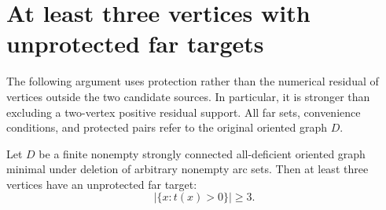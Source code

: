 \section{At least three vertices with unprotected far targets}
\label{sec:three-unprotected-vertices}

The following argument uses protection rather than the numerical
residual of vertices outside the two candidate sources. In particular,
it is stronger than excluding a two-vertex positive residual support.
All far sets, convenience conditions, and protected pairs refer to
the original oriented graph $D$.

\begin{theorem}\label{thm:three-unprotected-vertices}
Let $D$ be a finite nonempty strongly connected all-deficient oriented graph minimal
under deletion of arbitrary nonempty arc sets. Then at least three
vertices have an unprotected far target:
\[
 \bigl|\{x:t(x)>0\}\bigr|\ge3.
\]
\end{theorem}
